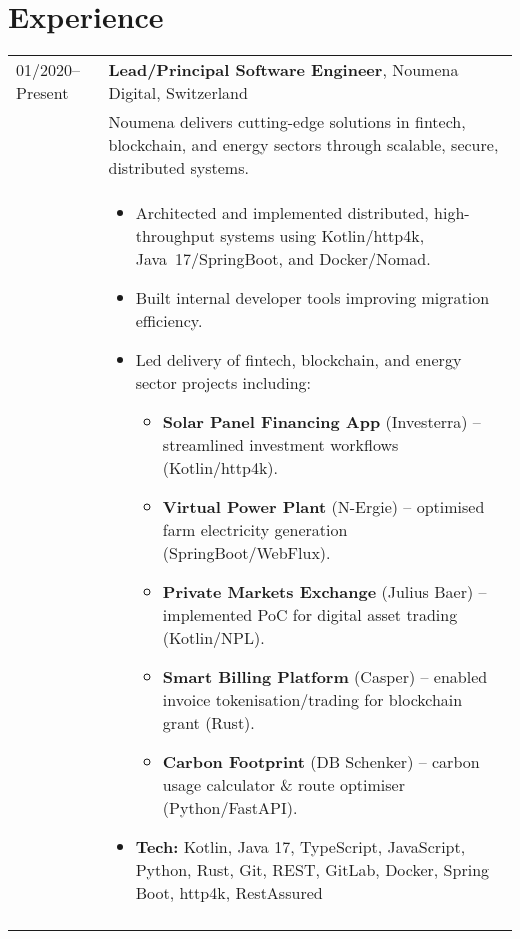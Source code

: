 \documentclass[2pt,a4paper]{article}
\newlength{\datecolumn}
\newlength{\textcolumn}
\begin{document}
\section*{Experience}
\begin{longtable}{p{\datecolumn} p{\textcolumn}}
01/2020--Present & \textbf{Lead/Principal Software Engineer}, Noumena Digital, Switzerland \\
                 & Noumena delivers cutting-edge solutions in fintech, blockchain, and energy sectors through scalable, secure, distributed systems. \\
                 & \begin{itemize}
                         \item Architected and implemented distributed, high-throughput systems using Kotlin/http4k, Java~17/SpringBoot, and Docker/Nomad.
                         \item Built internal developer tools improving migration efficiency.
                         \item Led delivery of fintech, blockchain, and energy sector projects including:
                         \begin{itemize}
                              \item \textbf{Solar Panel Financing App} (Investerra) – streamlined investment workflows (Kotlin/http4k).
                              \item \textbf{Virtual Power Plant} (N-Ergie) – optimised farm electricity generation (SpringBoot/WebFlux).
                              \item \textbf{Private Markets Exchange} (Julius Baer) – implemented PoC for digital asset trading (Kotlin/NPL).
                              \item \textbf{Smart Billing Platform} (Casper) – enabled invoice tokenisation/trading for blockchain grant (Rust).
                              \item \textbf{Carbon Footprint} (DB Schenker) – carbon usage calculator \& route optimiser (Python/FastAPI).
                         \end{itemize} 
                         \item \textbf{Tech:} Kotlin, Java 17, TypeScript, JavaScript, Python, Rust, Git, REST, GitLab, Docker, Spring Boot, http4k, RestAssured
                   \end{itemize} \\ \\

\end{longtable}
\end{document}
